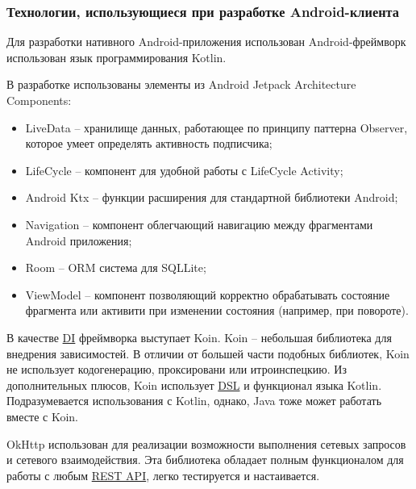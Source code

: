 
\subsubsection{Технологии, использующиеся при разработке Android-клиента}\indent

Для разработки нативного Android-приложения использован Android-фреймворк использован язык программирования Kotlin.

В разработке использованы элементы из Android Jetpack Architecture Components:
\begin{itemize}
    \item LiveData – хранилище данных, работающее по принципу паттерна Observer, которое умеет определять активность подписчика;
    \item LifeCycle – компонент для удобной работы с LifeCycle Activity;
    \item Android Ktx – функции расширения для стандартной библиотеки Android;
    \item Navigation – компонент облегчающий навигацию между фрагментами Android приложения;
    \item Room – ORM система для SQLLite;
    \item ViewModel – компонент позволяющий корректно обрабатывать состояние фрагмента или активити при изменении состояния (например, при повороте).
\end{itemize}

В качестве \hyperlink{gloss:di}{DI} фреймворка выступает Koin.
Koin – небольшая библиотека для внедрения зависимостей.
В отличии от большей части подобных библиотек, Koin не использует кодогенерацию, проксировани или итроинспецкию.
Из дополнительных плюсов, Koin использует \hyperlink{gloss:dsl}{DSL} и функционал языка Kotlin.
Подразумевается использования с Kotlin, однако, Java тоже может работать вместе с Koin.

OkHttp использован для реализации возможности выполнения сетевых запросов и сетевого взаимодействия.
Эта библиотека обладает полным функционалом для работы с любым \hyperlink{gloss:rest}{REST API}, легко тестируется и настаивается.
